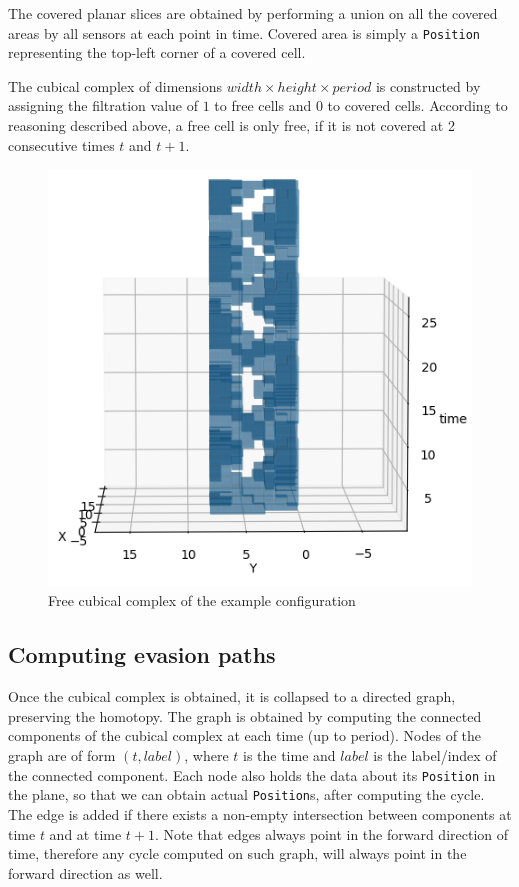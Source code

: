 \documentclass{article}
\begin{document}
The covered planar slices are obtained by performing a union on all the covered areas by all sensors at each point in time.
Covered area is simply a \texttt{Position} representing the top-left corner of a covered cell.

The cubical complex of dimensions $ width \times height \times period $ is constructed by assigning the filtration value of $1$ to free cells and $0$ to covered cells.
According to reasoning described above, a free cell is only free, if it is not covered at 2 consecutive times $t$ and $t + 1$.

\begin{figure}[H]
  \centering
  \includegraphics[width=0.7\linewidth]{example_cubical_complex.png}
  \caption{Free cubical complex of the example configuration}
  \label{fig:example_cub_complex}
\end{figure}


\subsection{Computing evasion paths}

Once the cubical complex is obtained, it is collapsed to a directed graph, preserving the homotopy.
The graph is obtained by computing the connected components of the cubical complex at each time (up to period).
Nodes of the graph are of form $(t, label)$, where $t$ is the time and $label$ is the label/index of the connected component.
Each node also holds the data about its \texttt{Position} in the plane, so that we can obtain actual \texttt{Position}s, after computing the cycle.
The edge is added if there exists a non-empty intersection between components at time $t$ and at time $t + 1$.
Note that edges always point in the forward direction of time, therefore any cycle computed on such graph, will always point in the forward direction as well.
\end{document}
